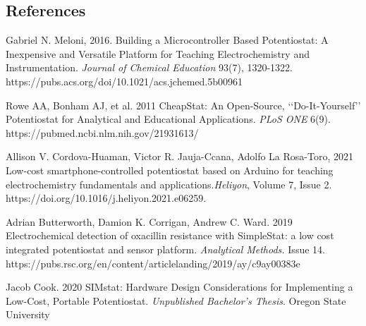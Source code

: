 \documentclass{article}
\begin{document}
\subsection*{References}
Gabriel N. Meloni, 2016. Building a Microcontroller Based Potentiostat: A Inexpensive and Versatile Platform for Teaching Electrochemistry and Instrumentation. \emph{Journal of Chemical Education} 93(7), 1320-1322. https://pubs.acs.org/doi/10.1021/acs.jchemed.5b00961

Rowe AA, Bonham AJ, et al. 2011 CheapStat: An Open-Source, ‘‘Do-It-Yourself’’ Potentiostat for Analytical and Educational Applications. \emph{PLoS ONE} 6(9). https://pubmed.ncbi.nlm.nih.gov/21931613/ 

Allison V. Cordova-Huaman, Victor R. Jauja-Ccana, Adolfo La Rosa-Toro, 2021 Low-cost smartphone-controlled potentiostat based on Arduino for teaching electrochemistry fundamentals and applications.\emph{Heliyon}, Volume 7, Issue 2. https://doi.org/10.1016/j.heliyon.2021.e06259.

Adrian Butterworth, Damion K. Corrigan, Andrew C. Ward. 2019 Electrochemical detection of oxacillin resistance with SimpleStat: a low cost integrated potentiostat and sensor platform. \emph{Analytical Methods.} Issue 14. https://pubs.rsc.org/en/content/articlelanding/2019/ay/c9ay00383e

Jacob Cook. 2020 SIMstat: Hardware Design Considerations for Implementing a Low-Cost, Portable Potentiostat. \emph{Unpublished Bachelor's Thesis}. Oregon State University
\end{document}
